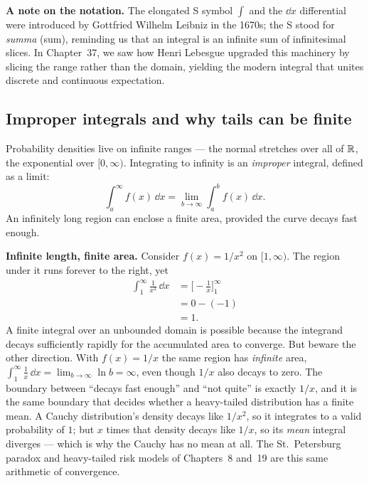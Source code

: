 \begin{intuitionbox}
\textbf{A note on the notation.} The elongated S symbol $\int$ and the $\dd x$ differential were introduced by Gottfried Wilhelm Leibniz in the 1670s; the S stood for \emph{summa} (sum), reminding us that an integral is an infinite sum of infinitesimal slices. In Chapter~37, we saw how Henri Lebesgue upgraded this machinery by slicing the range rather than the domain, yielding the modern integral that unites discrete and continuous expectation.
\end{intuitionbox}

\subsection{Improper integrals and why tails can be finite}
\label{chAcla:improper}

Probability densities live on infinite ranges --- the normal stretches over all of $\mathbb{R}$, the
exponential over $[0,\infty)$. Integrating to infinity is an \emph{improper} integral, defined as a
limit:
\[ \int_a^\infty f(x)\,\dd x = \lim_{b\to\infty}\int_a^b f(x)\,\dd x. \]
An infinitely long region can enclose a finite area, provided the curve
decays fast enough.

\begin{paradoxbox}
\textbf{Infinite length, finite area.} Consider $f(x)=1/x^2$ on $[1,\infty)$. The region under it
runs forever to the right, yet
\begin{align*}
  \int_1^\infty \frac{1}{x^2}\,\dd x &= \Big[-\tfrac1x\Big]_1^\infty \\
  &= 0-(-1) \\
  &= 1.
\end{align*}
A finite integral over an unbounded domain is possible because the integrand decays
sufficiently rapidly for the accumulated area to converge. But beware the other
direction. With $f(x)=1/x$ the same region has \emph{infinite} area, $\int_1^\infty \frac1x\,\dd x =
\lim_{b\to\infty}\ln b = \infty$, even though $1/x$ also decays to zero. The boundary between ``decays
fast enough'' and ``not quite'' is exactly $1/x$, and it is the same boundary that decides whether a
heavy-tailed distribution has a finite mean. A Cauchy distribution's density decays like $1/x^2$, so
it integrates to a valid probability of $1$; but $x$ times that density decays like $1/x$, so its
\emph{mean} integral diverges --- which is why the Cauchy has no mean at all. The St.\ Petersburg
paradox and heavy-tailed risk models of Chapters~8 and~19 are this same arithmetic of
convergence.
\end{paradoxbox}

